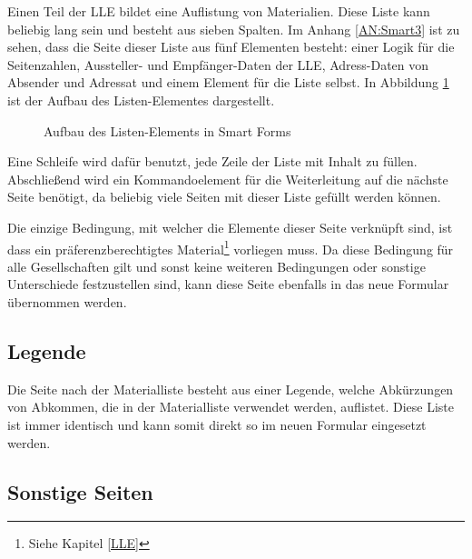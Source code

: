 	Einen Teil der \ac{LLE} bildet eine Auflistung von Materialien. Diese Liste kann beliebig lang sein und besteht aus sieben Spalten. Im Anhang \ref{AN:Smart3} ist zu sehen, dass die Seite dieser Liste aus fünf Elementen besteht: einer Logik für die Seitenzahlen, Aussteller- und Empfänger-Daten der \ac{LLE}, Adress-Daten von Absender und Adressat und einem Element für die Liste selbst.
	In Abbildung \ref{list_smart} ist der Aufbau des Listen-Elementes dargestellt.
	
	\begin{figure}[ht]
		\centering
		\caption{Aufbau des Listen-Elements in Smart Forms}
		\label{list_smart}
	\end{figure}
	
	Eine Schleife wird dafür benutzt, jede Zeile der Liste mit Inhalt zu füllen. Abschließend wird ein Kommandoelement für die Weiterleitung auf die nächste Seite benötigt, da beliebig viele Seiten mit dieser Liste gefüllt werden können.
	
	Die einzige Bedingung, mit welcher die Elemente dieser Seite verknüpft sind, ist dass ein präferenzberechtigtes Material\footnote{Siehe Kapitel \ref{LLE}} vorliegen muss. Da diese Bedingung für alle Gesellschaften gilt und sonst keine weiteren Bedingungen oder sonstige Unterschiede festzustellen sind, kann diese Seite ebenfalls in das neue Formular übernommen werden. 
	
	\subsection{Legende}
	
	Die Seite nach der Materialliste besteht aus einer Legende, welche Abkürzungen von Abkommen, die in der Materialliste verwendet werden, auflistet. Diese Liste ist immer identisch und kann somit direkt so im neuen Formular eingesetzt werden.
	
	
	\subsection{Sonstige Seiten}
	
